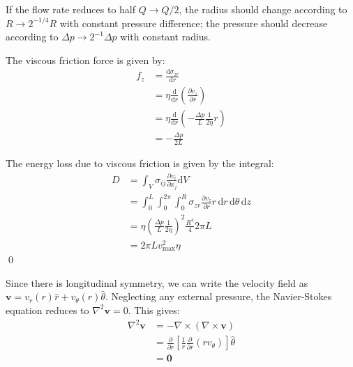 \documentclass[12pt]{article}
\begin{document}
If the flow rate reduces to half $Q \to Q/2$, the radius should change according to $R \to 2^{-1/4} R$ with constant pressure difference; the pressure should decrease according to $\Delta p \to 2^{-1} \Delta p$ with constant radius.

The viscous friction force is given by:
\begin{equation}
    \begin{split}
        f_{z} &= \frac{\mathrm{d}\sigma_{zr}}{\mathrm{d}r} \\
        &= \eta \frac{\mathrm{d}}{\mathrm{d}r} \left( \frac{\partial v_{z}}{\partial r} \right) \\
        &= \eta \frac{\mathrm{d}}{\mathrm{d}r} \left( -\frac{\Delta p}{L} \frac{1}{2\eta} r \right) \\
        &= -\frac{\Delta p}{2L}
    \end{split}
\end{equation}

The energy loss due to viscous friction is given by the integral:
\begin{equation}
    \begin{split}
        D &= \int_{V} \sigma_{ij} \frac{\partial v_{i}}{\partial x_{j}} \mathrm{d}V \\
        &= \int_{0}^{L} \int_{0}^{2\pi} \int_{0}^{R} \sigma_{zr} \frac{\partial v_{z}}{\partial r} r \, \mathrm{d}r \, \mathrm{d}\theta \, \mathrm{d}z \\
        &= \eta \left( \frac{\Delta p}{L} \frac{1}{2\eta} \right)^{2} \frac{R^{4}}{4} 2\pi L \\
        &= 2\pi L v_{\text{max}}^{2} \eta
    \end{split}
\end{equation}
\qed



Since there is longitudinal symmetry, we can write the velocity field as $\mathbf{v} = v_{r}(r)\hat{r} + v_{\theta}(r)\hat{\theta}$. Neglecting any external pressure, the Navier-Stokes equation reduces to $\nabla^{2} \mathbf{v} = 0$. This gives:
\begin{equation}
    \begin{split}
        \nabla^{2} \mathbf{v} &= -\nabla \times (\nabla \times \mathbf{v}) \\
        &= \frac{\partial }{\partial r} \left[ \frac{1}{r} \frac{\partial}{\partial r} (r v_{\theta}) \right] \hat{\theta} \\
        &= \mathbf{0}
    \end{split}
\end{equation}
\end{document}
